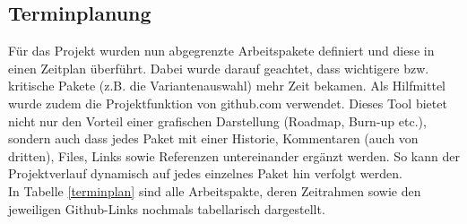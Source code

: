 \subsection{Terminplanung}
Für das Projekt wurden nun abgegrenzte Arbeitspakete definiert und diese in einen Zeitplan überführt. Dabei wurde darauf geachtet, dass wichtigere bzw. kritische Pakete (z.B. die Variantenauswahl) mehr Zeit bekamen. Als Hilfmittel wurde zudem die Projektfunktion von github.com verwendet. Dieses Tool bietet nicht nur den Vorteil einer grafischen Darstellung (Roadmap, Burn-up etc.), sondern auch dass jedes Paket mit einer Historie, Kommentaren (auch von dritten), Files, Links sowie Referenzen untereinander ergänzt werden. So kann der Projektverlauf dynamisch auf jedes einzelnes Paket hin verfolgt werden.\\In Tabelle \ref{terminplan} sind alle Arbeitspakte, deren Zeitrahmen sowie den jeweiligen Github-Links nochmals tabellarisch dargestellt.
